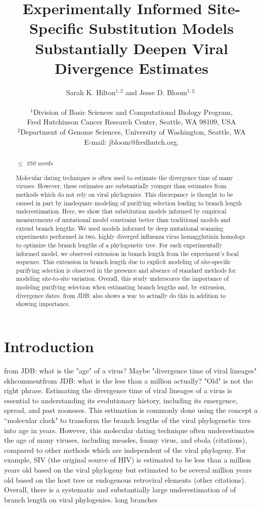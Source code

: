 \documentclass[11pt]{article}
\title{Experimentally Informed Site-Specific Substitution Models Substantially Deepen Viral Divergence Estimates}
\author
{Sarah K. Hilton$^{1,2}$  and Jesse D. Bloom$^{1,2,}$\\
\\
\normalsize{$^1$Division of Basic Sciences and Computational Biology Program,}\\
\normalsize{Fred Hutchinson Cancer Research Center, Seattle, WA 98109, USA}\\
\normalsize{$^2$Department of Genome Sciences, University of Washington, Seattle, WA}\\
\normalsize{E-mail:  jbloom@fredhutch.org.}\\
}
\date{}
\newcommand\skhcomment[1]{{\color{cyan}#1}}
\begin{document}
 


\maketitle 


\begin{abstract}
\textit{$\leq$ 250 words}   

Molecular dating techniques is often used to estimate the divergence time of many viruses. 
However, these estimates are substantially younger than estimates from methods which do not rely on viral phylogenies. 
This discrepancy is thought to be caused in part by inadequate modeling of purifying selection leading to branch length underestimation. 
Here, we show that substitution models informed by empirical measurements of mutational model constraint better than traditional models and extend branch lengths. 
We used models informed by deep mutational scanning experiments performed in two, highly diverged influenza virus hemagglutinin homologs to optimize the branch lengths of a phylogenetic tree. 
For each experimentally informed model, we observed extension in branch length from the experiment's focal sequence. 
This extension in branch length due to explicit modeling of site-specific purifying selection is observed in the presence and absence of standard methods for modeling site-to-site variation. 
Overall, this study underscores the importance of modeling purifying selection when estimating branch lengths and, by extension, divergence dates. 
\skhcomment{from JDB: also shows a way to actually do this in addition to showing importance.}

\end{abstract}

\clearpage

\section*{Introduction} 
\skhcomment{from JDB: what is the "age" of a virus? Maybe "divergence time of viral lineages"}
skhcomment{from JDB: what is the less than a million actually? "Old" is not the right phrase.}
Estimating the divergence time of viral lineages of a virus is essential to understanding its evolutionary history, including its emergence, spread, and past zoonoses. 
This estimation is commonly done using the concept a ``molecular clock" to transform the branch lengths of the viral phylogenetic tree into age in years. 
However, this molecular dating technique often underestimates the age of many viruses, including measles, foamy virus, and ebola \skhcomment{(citations)}, compared to other methods which are independent of the viral phylogeny. 
For example, SIV (the original source of HIV) is estimated to be less than a million years old based on the viral phylogeny \citep{sharp2000origins,wertheim2009dating,worobey2010island} but estimated to be several million years old based on the host tree or endogenous retroviral elements  \citep{compton2013host} \skhcomment{(other citations)}. 
Overall, there is a systematic and substantially large underestimation of of branch length on viral phylogenies. 
\skhcomment{long branches}
\end{document}
